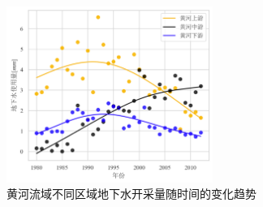 \begin{figure}[htb]
    \centering
    \includegraphics[width=0.6\textwidth]{img/ch6/ch6_groundwater.png}
    \caption{黄河流域不同区域地下水开采量随时间的变化趋势}\label{ch6:fig:groundwater}
\end{figure}